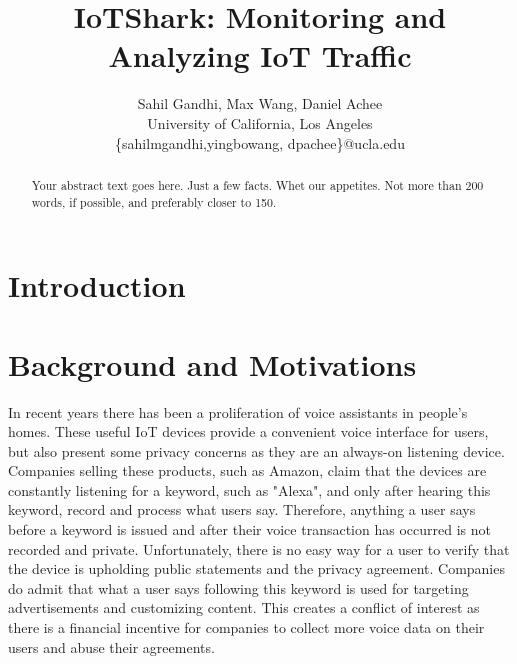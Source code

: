 \documentclass[letterpaper,twocolumn,10pt]{article}
\begin{document}

\date{}

\title{\Large \bf IoTShark: Monitoring and Analyzing IoT Traffic}

\author{
{\rm Sahil Gandhi, Max Wang, Daniel Achee}\\
University of California, Los Angeles \\
\{sahilmgandhi,yingbowang, dpachee\}@ucla.edu
} %

\maketitle

\begin{abstract}
Your abstract text goes here. Just a few facts. Whet our appetites.
Not more than 200 words, if possible, and preferably closer to 150.
\end{abstract}

\section{Introduction}


\section{Background and Motivations}

In recent years there has been a proliferation of voice assistants in people’s homes. These useful IoT devices provide a convenient voice interface for users, but also present some privacy concerns as they are an always-on listening device. Companies selling these products, such as Amazon, claim that the devices are constantly listening for a keyword, such as "Alexa", and only after hearing this keyword, record and process what users say. Therefore, anything a user says before a keyword is issued and after their voice transaction has occurred is not recorded and private. Unfortunately, there is no easy way for a user to verify that the device is upholding public statements and the privacy agreement. Companies do admit that what a user says following this keyword is used for targeting advertisements and customizing content. This creates a conflict of interest as there is a financial incentive for companies to collect more voice data on their users and abuse their agreements.
\end{document}
